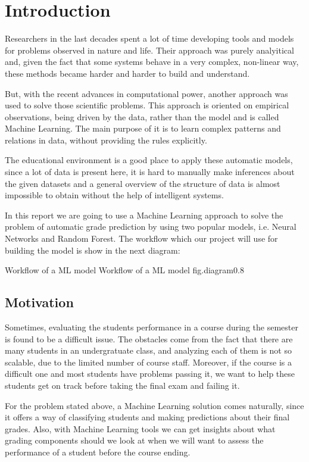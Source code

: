 \chapter{Introduction}

Researchers in the last decades spent a lot of time developing tools and 
models for problems observed in nature and life. Their approach was purely 
analyitical and, given the fact that some systems behave in a very complex, 
non-linear way, these methods became harder and harder to build and 
understand. 

But, with the recent advances in computational power, another approach was 
used to solve those scientific problems. This approach is oriented on 
empirical observations, being driven by the data, rather than the model and 
is called Machine Learning. The main purpose of it is to learn complex patterns 
and relations in data, without providing the rules explicitly.

The educational environment is a good place to apply these automatic models, 
since a lot of data is present here, it is hard to manually make inferences 
about the given datasets and a general overview of the structure of data is 
almost impossible to obtain without the help of intelligent systems.

In this report we are going to use a Machine Learning approach to solve the 
problem of automatic grade prediction by using two popular models, i.e. 
Neural Networks and Random Forest. The workflow which our project will use 
for building the model is show in the next diagram: 

%
    {Workflow of a ML model}%
    {Workflow of a ML model}%
    {fig.diagram}{0.8}


\section{Motivation}

Sometimes, evaluating the students performance in a course during the semester 
is found to be a difficult issue. The obstacles come from the fact that there 
are many students in an undergratuate class, and analyzing each of them is 
not so scalable, due to the limited number of course staff. Moreover, if the 
course is a difficult one and most students have problems passing it, we
want to help these students get on track before taking the final exam and 
failing it. 

For the problem stated above, a Machine Learning solution comes naturally, 
since it offers a way of classifying students and making predictions about 
their final grades. Also, with Machine Learning tools we can get insights 
about what grading components should we look at when we will want to assess 
the performance of a student before the course ending.

